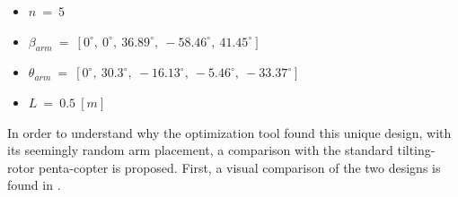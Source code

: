 {\small\begin{itemize}
  \item $n\ =\ 5$
  \item $\beta_{arm}\ =\ [0^{\circ},\  0^{\circ},\  36.89^{\circ},\  -58.46^{\circ},\   41.45^{\circ}]$
  \item $\theta_{arm}\ =\ [0^{\circ},\  30.3^{\circ},\  -16.13^{\circ},\  -5.46^{\circ},\  -33.37^{\circ}]$
  \item $L\ =\ 0.5\ [m]$
\end{itemize}}

In order to understand why the optimization tool found this unique design,
with its seemingly random arm placement, a comparison with the standard
tilting-rotor penta-copter is proposed. First, a  visual comparison of the
two designs is found in .

